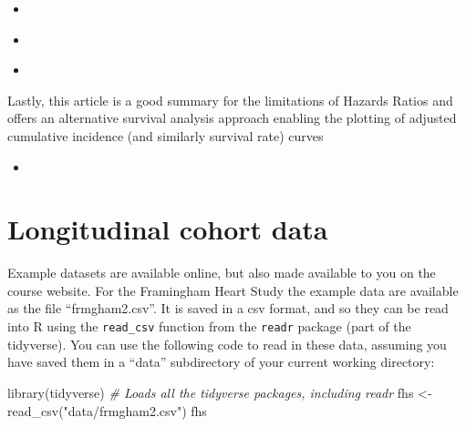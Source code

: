 \documentclass[
]{book}
\newenvironment{Shaded}{\begin{snugshade}}{\end{snugshade}}
\newcommand{\CommentTok}[1]{\textcolor[rgb]{0.56,0.35,0.01}{\textit{#1}}}
\newcommand{\FunctionTok}[1]{\textcolor[rgb]{0.00,0.00,0.00}{#1}}
\newcommand{\NormalTok}[1]{#1}
\newcommand{\OtherTok}[1]{\textcolor[rgb]{0.56,0.35,0.01}{#1}}
\newcommand{\StringTok}[1]{\textcolor[rgb]{0.31,0.60,0.02}{#1}}
\providecommand{\tightlist}{%
  \setlength{\itemsep}{0pt}\setlength{\parskip}{0pt}}
\begin{document}
\begin{itemize}
\item
  \citet{clark2003survival}
\item
  \citet{bradburn2003survival}
\item
  \citet{bradburn2003survival2}
\end{itemize}

Lastly, this article is a good summary for the limitations of Hazards Ratios and offers an alternative survival analysis approach enabling the plotting of adjusted cumulative incidence (and similarly survival rate) curves

\begin{itemize}
\tightlist
\item
  \citet{hernan2010hazards}
\end{itemize}

\hypertarget{longitudinal-cohort-data}{%
\section{Longitudinal cohort data}\label{longitudinal-cohort-data}}

Example datasets are available online, but also made available to you on the course
website. For the Framingham Heart Study the example data are available as the file
``frmgham2.csv''. It is saved in a csv format, and so they can be read into R using the
\texttt{read\_csv} function from the \texttt{readr} package (part of the tidyverse). You can use the following code to read in these data, assuming you have saved them in a ``data'' subdirectory of your current
working directory:

\begin{Shaded}
\begin{Highlighting}[]
\FunctionTok{library}\NormalTok{(tidyverse) }\CommentTok{\# Loads all the tidyverse packages, including readr}
\NormalTok{fhs }\OtherTok{\textless{}{-}} \FunctionTok{read\_csv}\NormalTok{(}\StringTok{"data/frmgham2.csv"}\NormalTok{)}
\NormalTok{fhs}
\end{Highlighting}
\end{Shaded}
\end{document}
